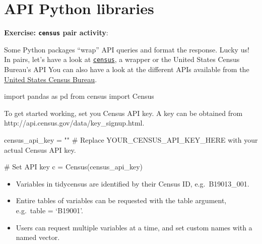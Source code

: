 \documentclass[
  letterpaper,
  DIV=11,
  numbers=noendperiod]{scrreprt}
\newenvironment{Shaded}{\begin{snugshade}}{\end{snugshade}}
\newcommand{\CommentTok}[1]{\textcolor[rgb]{0.37,0.37,0.37}{#1}}
\newcommand{\ImportTok}[1]{\textcolor[rgb]{0.00,0.46,0.62}{#1}}
\newcommand{\NormalTok}[1]{\textcolor[rgb]{0.00,0.23,0.31}{#1}}
\newcommand{\OperatorTok}[1]{\textcolor[rgb]{0.37,0.37,0.37}{#1}}
\newcommand{\StringTok}[1]{\textcolor[rgb]{0.13,0.47,0.30}{#1}}
\providecommand{\tightlist}{%
  \setlength{\itemsep}{0pt}\setlength{\parskip}{0pt}}\usepackage{longtable,booktabs,array}
\begin{document}
\hypertarget{api-python-libraries}{%
\section{API Python libraries}\label{api-python-libraries}}

\textbf{Exercise: \texttt{census} pair activity}:

Some Python packages ``wrap'' API queries and format the response. Lucky
us! In pairs, let's have a look at
\href{https://github.com/datamade/census/tree/master}{\texttt{census}},
a wrapper or the United States Census Bureau's API You can also have a
look at the different APIs available from the
\href{https://www.census.gov/data/developers.html}{United States Census
Bureau}.

\begin{Shaded}
\begin{Highlighting}[]
\ImportTok{import}\NormalTok{ pandas }\ImportTok{as}\NormalTok{ pd}
\ImportTok{from}\NormalTok{ census }\ImportTok{import}\NormalTok{ Census}
\end{Highlighting}
\end{Shaded}

To get started working, set you Census API key. A key can be obtained
from http://api.census.gov/data/key\_signup.html.

\begin{Shaded}
\begin{Highlighting}[]
\NormalTok{census\_api\_key }\OperatorTok{=} \StringTok{""} \CommentTok{\# Replace \textquotesingle{}YOUR\_CENSUS\_API\_KEY\_HERE\textquotesingle{} with your actual Census API key.}
\end{Highlighting}
\end{Shaded}

\begin{Shaded}
\begin{Highlighting}[]
\CommentTok{\# Set API key}
\NormalTok{c }\OperatorTok{=}\NormalTok{ Census(census\_api\_key)}
\end{Highlighting}
\end{Shaded}

\begin{itemize}
\tightlist
\item
  Variables in tidycensus are identified by their Census ID,
  e.g.~B19013\_001.
\item
  Entire tables of variables can be requested with the table argument,
  e.g.~table = `B19001'.
\item
  Users can request multiple variables at a time, and set custom names
  with a named vector.
\end{itemize}
\end{document}
